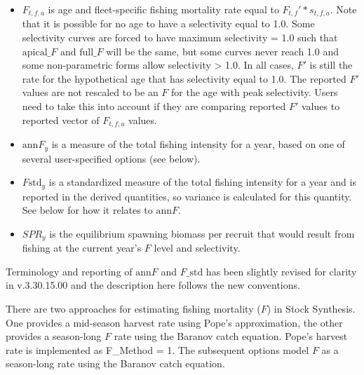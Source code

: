 \begin{itemize}
	\item $F_{t,f,a}$ is age and fleet-specific fishing mortality rate equal to $F_{t,f}' * s_{t,f,a}$. Note that it is possible for no age to have a selectivity equal to 1.0. Some selectivity curves are forced to have maximum selectivity = 1.0 such that $\text{apical\_}F$ and $\text{full\_}F$ will be the same, but some curves never reach 1.0 and some non-parametric forms allow selectivity > 1.0. In all cases, $F'$ is still the rate for the hypothetical age that has selectivity equal to 1.0. The reported $F'$ values are not rescaled to be an $F$ for the age with peak selectivity. Users need to take this into account if they are comparing reported $F'$ values to reported vector of $F_{t,f,a}$ values.
	\item $\text{ann}F_y$ is a measure of the total fishing intensity for a year, based on one of several user-specified options (see below).
	\item $F\text{std}_y$ is a standardized measure of the total fishing intensity for a year and is reported in the derived quantities, so variance is calculated for this quantity. See below for how it relates to $\text{ann}F$.
	\item $SPR_y$ is the equilibrium spawning biomass per recruit that would result from fishing at the current year’s $F$ level and selectivity.
\end{itemize}

Terminology and reporting of $\text{ann}F$ and $F\text{\_std}$ has been slightly revised for clarity in v.3.30.15.00 and the description here follows the new conventions.

There are two approaches for estimating fishing mortality ($F$) in Stock Synthesis. One provides a mid-season harvest rate using Pope’s approximation, the other provides a season-long $F$ rate using the Baranov catch equation. Pope’s harvest rate is implemented as F\_Method = 1. The subsequent options model $F$ as a season-long rate using the Baranov catch equation.


